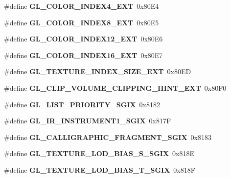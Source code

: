\begin{DoxyCompactItemize}
\item 
\#define {\bfseries G\+L\+\_\+\+C\+O\+L\+O\+R\+\_\+\+I\+N\+D\+E\+X4\+\_\+\+E\+X\+T}~0x80\+E4\label{_s_d_l__opengl_8h_a3e066ff71c6537f79910469d46d8c1ad}

\item 
\#define {\bfseries G\+L\+\_\+\+C\+O\+L\+O\+R\+\_\+\+I\+N\+D\+E\+X8\+\_\+\+E\+X\+T}~0x80\+E5\label{_s_d_l__opengl_8h_a415d3122c4e51790002876126a307c78}

\item 
\#define {\bfseries G\+L\+\_\+\+C\+O\+L\+O\+R\+\_\+\+I\+N\+D\+E\+X12\+\_\+\+E\+X\+T}~0x80\+E6\label{_s_d_l__opengl_8h_a0925dc8b933713a94efcff87cd39bba8}

\item 
\#define {\bfseries G\+L\+\_\+\+C\+O\+L\+O\+R\+\_\+\+I\+N\+D\+E\+X16\+\_\+\+E\+X\+T}~0x80\+E7\label{_s_d_l__opengl_8h_ac0599b7d1f9b099b212a08eae6ae23f3}

\item 
\#define {\bfseries G\+L\+\_\+\+T\+E\+X\+T\+U\+R\+E\+\_\+\+I\+N\+D\+E\+X\+\_\+\+S\+I\+Z\+E\+\_\+\+E\+X\+T}~0x80\+E\+D\label{_s_d_l__opengl_8h_ad91656131e579ff320f55be18359f3a2}

\item 
\#define {\bfseries G\+L\+\_\+\+C\+L\+I\+P\+\_\+\+V\+O\+L\+U\+M\+E\+\_\+\+C\+L\+I\+P\+P\+I\+N\+G\+\_\+\+H\+I\+N\+T\+\_\+\+E\+X\+T}~0x80\+F0\label{_s_d_l__opengl_8h_a1fff75c0542989ebe40b2abe80648743}

\item 
\#define {\bfseries G\+L\+\_\+\+L\+I\+S\+T\+\_\+\+P\+R\+I\+O\+R\+I\+T\+Y\+\_\+\+S\+G\+I\+X}~0x8182\label{_s_d_l__opengl_8h_a8341b5128ddba62d73e46d33e9e486db}

\item 
\#define {\bfseries G\+L\+\_\+\+I\+R\+\_\+\+I\+N\+S\+T\+R\+U\+M\+E\+N\+T1\+\_\+\+S\+G\+I\+X}~0x817\+F\label{_s_d_l__opengl_8h_a9c98811c3373380e0be6657701310528}

\item 
\#define {\bfseries G\+L\+\_\+\+C\+A\+L\+L\+I\+G\+R\+A\+P\+H\+I\+C\+\_\+\+F\+R\+A\+G\+M\+E\+N\+T\+\_\+\+S\+G\+I\+X}~0x8183\label{_s_d_l__opengl_8h_a4dae47be45a802d3b9d61febe0663798}

\item 
\#define {\bfseries G\+L\+\_\+\+T\+E\+X\+T\+U\+R\+E\+\_\+\+L\+O\+D\+\_\+\+B\+I\+A\+S\+\_\+\+S\+\_\+\+S\+G\+I\+X}~0x818\+E\label{_s_d_l__opengl_8h_a633117773eb3ec25ac37a6cef26111ff}

\item 
\#define {\bfseries G\+L\+\_\+\+T\+E\+X\+T\+U\+R\+E\+\_\+\+L\+O\+D\+\_\+\+B\+I\+A\+S\+\_\+\+T\+\_\+\+S\+G\+I\+X}~0x818\+F\label{_s_d_l__opengl_8h_a21f994d255480fb301d22d8fc55dc051}


\end{DoxyCompactItemize}
